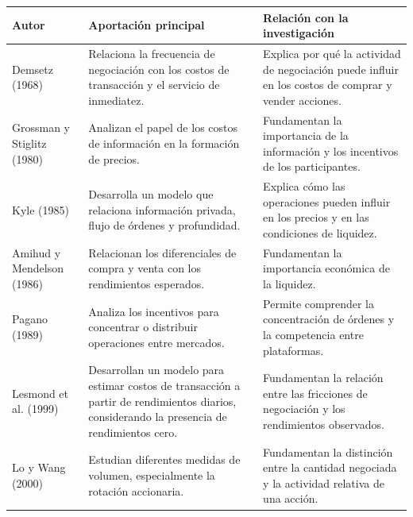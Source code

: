 {\small
\begin{longtable}[]{@{}
  >{\raggedright\arraybackslash}p{}
  >{\raggedright\arraybackslash}p{}
  >{\raggedright\arraybackslash}p{}@{}}
\toprule\noalign{}
\begin{minipage}[b]{\linewidth}\raggedright
\textbf{Autor}
\end{minipage} & \begin{minipage}[b]{\linewidth}\raggedright
\textbf{Aportación principal}
\end{minipage} & \begin{minipage}[b]{\linewidth}\raggedright
\textbf{Relación con la investigación}
\end{minipage} \\
\midrule\noalign{}
\endhead
\bottomrule\noalign{}
\endlastfoot
Demsetz (1968) & Relaciona la frecuencia de negociación con los costos de transacción y el servicio de inmediatez. & Explica por qué la actividad de negociación puede influir en los costos de comprar y vender acciones. \\
Grossman y Stiglitz (1980) & Analizan el papel de los costos de información en la formación de precios. & Fundamentan la importancia de la información y los incentivos de los participantes. \\
Kyle (1985) & Desarrolla un modelo que relaciona información privada, flujo de órdenes y profundidad. & Explica cómo las operaciones pueden influir en los precios y en las condiciones de liquidez. \\
Amihud y Mendelson (1986) & Relacionan los diferenciales de compra y venta con los rendimientos esperados. & Fundamentan la importancia económica de la liquidez. \\
Pagano (1989) & Analiza los incentivos para concentrar o distribuir operaciones entre mercados. & Permite comprender la concentración de órdenes y la competencia entre plataformas. \\
Lesmond et al. (1999) & Desarrollan un modelo para estimar costos de transacción a partir de rendimientos diarios, considerando la presencia de rendimientos cero. & Fundamentan la relación entre las fricciones de negociación y los rendimientos observados. \\
Lo y Wang (2000) & Estudian diferentes medidas de volumen, especialmente la rotación accionaria. & Fundamentan la distinción entre la cantidad negociada y la actividad relativa de una acción. \\

\end{longtable}}
